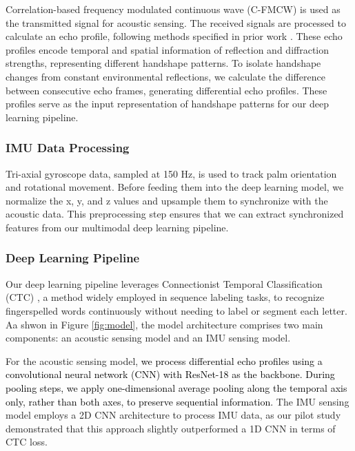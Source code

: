 Correlation-based frequency modulated continuous wave (C-FMCW) \cite{wang2018c} is used as the transmitted signal for acoustic sensing. The received signals are processed to calculate an echo profile, following methods specified in prior work \cite{yu2024ring,li2022eario,zhang2023echospeech}. These echo profiles encode temporal and spatial information of reflection and diffraction strengths, representing different handshape patterns. To isolate handshape changes from constant environmental reflections, we calculate the difference between consecutive echo frames, generating differential echo profiles. These profiles serve as the input representation of handshape patterns for our deep learning pipeline.

\subsubsection{IMU Data Processing}
Tri-axial gyroscope data, sampled at 150 Hz, is used to track palm orientation and rotational movement. Before feeding them into the deep learning model, we normalize the x, y, and z values and upsample them to synchronize with the acoustic data. This preprocessing step ensures that we can extract synchronized features from our multimodal deep learning pipeline.

\subsubsection{Deep Learning Pipeline}
Our deep learning pipeline leverages Connectionist Temporal Classification (CTC) \cite{graves2006connectionist,zhang2023echospeech}, a method widely employed in sequence labeling tasks, to recognize fingerspelled words continuously without needing to label or segment each letter. Aa shwon in Figure \ref{fig:model}, the model architecture comprises two main components: an acoustic sensing model and an IMU sensing model.


For the acoustic sensing model, \textcolor{black}{we process differential echo profiles using a convolutional neural network (CNN) with ResNet-18 as the backbone. During pooling steps, we apply one-dimensional average pooling along the temporal axis only, rather than both axes, to preserve sequential information.} The IMU sensing model employs a 2D CNN architecture to process IMU data, as our pilot study demonstrated that this approach slightly outperformed a 1D CNN in terms of CTC loss.

